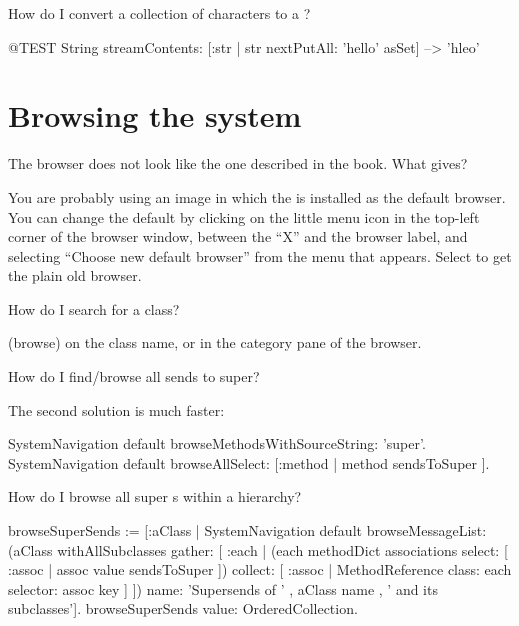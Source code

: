 \documentclass[a4paper,10pt,twoside]{book}
\begin{document}
\begin{faq}
How do I convert a collection of characters to a ?
\end{faq}
\answer
\begin{code}{@TEST}
String streamContents: [:str | str nextPutAll: 'hello' asSet] --> 'hleo'
\end{code}

\section{Browsing the system}


\begin{faq}\label{faq:omnibrowser}
The browser does not look like the one described in the book. What gives?
\end{faq}
\answer
\fix
You are probably using an image in which the  is installed as the default browser.  You can change the default by clicking on the little menu icon in the top-left corner of the browser window, between the ``\textsf{X}'' and the browser label, and selecting ``Choose new default browser'' from the menu that appears. Select  to get the plain old browser.

\begin{faq}
How do I search for a class?
\end{faq}
\answer
{} (browse) on the class name, or  in the category pane of the browser.

\begin{faq}
How do I find/browse all sends to super?
\end{faq}
\answer
The second solution is much faster:
\begin{code}{}
SystemNavigation default browseMethodsWithSourceString: 'super'.
SystemNavigation default browseAllSelect: [:method | method sendsToSuper ].
\end{code}

\begin{faq}
How do I browse all super s within a hierarchy?
\end{faq}
\answer
\begin{code}{}
browseSuperSends := [:aClass | SystemNavigation default
	browseMessageList: (aClass withAllSubclasses gather: [ :each |
		(each methodDict associations
			select: [ :assoc | assoc value sendsToSuper ])
				collect: [ :assoc | MethodReference class: each selector: assoc key ] ])
	name: 'Supersends of ' , aClass name , ' and its subclasses'].
browseSuperSends value: OrderedCollection.
\end{code}
\end{document}
